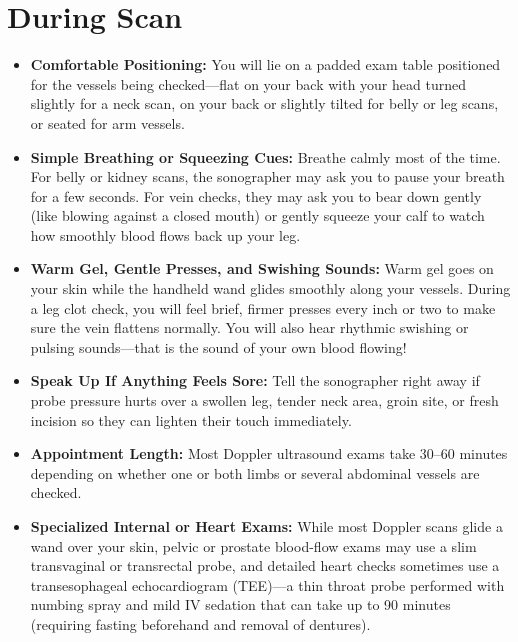 \section{During Scan}
\begin{itemize}
\item \textbf{Comfortable Positioning:} You will lie on a padded exam table positioned for the vessels being checked---flat on your back with your head turned slightly for a neck scan, on your back or slightly tilted for belly or leg scans, or seated for arm vessels.
\item \textbf{Simple Breathing or Squeezing Cues:} Breathe calmly most of the time. For belly or kidney scans, the sonographer may ask you to pause your breath for a few seconds. For vein checks, they may ask you to bear down gently (like blowing against a closed mouth) or gently squeeze your calf to watch how smoothly blood flows back up your leg.
\item \textbf{Warm Gel, Gentle Presses, and Swishing Sounds:} Warm gel goes on your skin while the handheld wand glides smoothly along your vessels. During a leg clot check, you will feel brief, firmer presses every inch or two to make sure the vein flattens normally. You will also hear rhythmic swishing or pulsing sounds---that is the sound of your own blood flowing!
\item \textbf{Speak Up If Anything Feels Sore:} Tell the sonographer right away if probe pressure hurts over a swollen leg, tender neck area, groin site, or fresh incision so they can lighten their touch immediately.
\item \textbf{Appointment Length:} Most Doppler ultrasound exams take 30--60 minutes depending on whether one or both limbs or several abdominal vessels are checked.
\item \textbf{Specialized Internal or Heart Exams:} While most Doppler scans glide a wand over your skin, pelvic or prostate blood-flow exams may use a slim transvaginal or transrectal probe, and detailed heart checks sometimes use a transesophageal echocardiogram (TEE)---a thin throat probe performed with numbing spray and mild IV sedation that can take up to 90 minutes (requiring fasting beforehand and removal of dentures).
\end{itemize}

